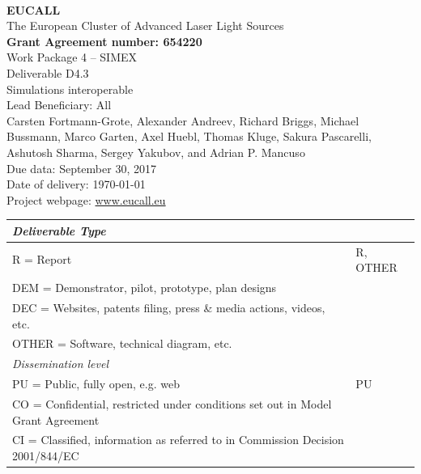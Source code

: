 \documentclass[10pt]{scrartcl}
\begin{document}
\makeatletter
\begin{titlepage}
\thispagestyle{scrheadings}
\begin{center}
$~$\\
\vspace{0cm}
{\Large\textbf{EUCALL}\\[2ex]
The European Cluster of Advanced Laser Light Sources}\\[4ex]
%
{\small\textbf{Grant Agreement number: 654220}}\\[8ex]
%
Work Package 4 -- SIMEX\\[4ex]
%
Deliverable D4.3\\
%
Simulations interoperable\\[5ex]
%
Lead Beneficiary: All\\[5ex]
%
Carsten Fortmann-Grote, Alexander Andreev, Richard Briggs, Michael Bussmann,
  Marco Garten, Axel Huebl, Thomas Kluge,
  Sakura Pascarelli, Ashutosh Sharma, Sergey Yakubov, and Adrian P. Mancuso\\[4ex]
%
Due data: September 30, 2017\\
Date of delivery: \today \\[4ex]
%
Project webpage: \url{www.eucall.eu}\\[6ex]
%
{%
\small
\begin{tabular}{|l|l|}
  \hline
  \multicolumn{2}{|l|}{ \textit{Deliverable Type} } \\
  \hline
  R = Report\hfill & R, OTHER \\
  DEM = Demonstrator, pilot, prototype, plan designs & \\
  DEC = Websites, patents filing, press \& media actions, videos, etc. & \\
  OTHER = Software, technical diagram, etc. & \\
  \hline
  \multicolumn{2}{|l|}{\textit{Dissemination level}} \\
  \hline
  PU = Public, fully open, e.g. web & PU \\
  CO = Confidential, restricted under conditions set out in Model Grant
  Agreement\hspace*{17ex}\  & \\
  CI = Classified, information as referred to in Commission Decision 2001/844/EC
  & \\
  \hline
\end{tabular}
}

\end{center}
%
{}
\normalfont
\end{titlepage}
\makeatother
\end{document}
